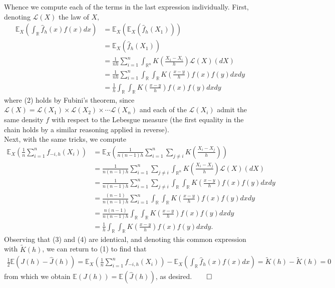 \documentclass[10pt]{article}
\newcommand{\E}{\mathbb{E}}
\newcommand{\bp}[1]{\left({#1}\right)}
\newcommand{\mbb}[1]{\mathbb{#1}}
\newcommand{\1}[1]{\mathbbm{1}_{#1}}
\newcommand{\mc}[1]{\mathcal{#1}}
\begin{document}
    Whence we compute each of the terms in the last expression individually. First, denoting $\mc{L}(X)$ the law of $X$, 
    \begin{align*}
        \E_X\bp{\int_\mbb{R}\hat{f}_h(x)f(x)dx}&=\E_X\bp{\E_X\bp{\hat{f}_h(X_1)}}\tag{since $X_1,\dots,X_n$ are i.i.d.}\\
        &=\E_X\bp{\hat{f}_h(X_1)}\\
        &=\frac{1}{nh}\sum_{i=1}^n\int_{\mbb{R}^n}K\bp{\frac{X_1-X_i}{h}}\mc{L}(X)(dX)\\
        &=\frac{1}{nh}\sum_{i=1}^n\int_\mbb{R}\int_{\mbb{R}}K\bp{\frac{x-y}{h}}f(x)f(y)dxdy\tag{2}\\
        &=\frac{1}{h}\int_\mbb{R}\int_\mbb{R}K\bp{\frac{x-y}{h}}f(x)f(y)dxdy\tag{3}
    \end{align*}
    where (2) holds by Fubini's theorem, since $\mc{L}(X)=\mc{L}(X_1)\times\mc{L}(X_2)\times\cdots\mc{L}(X_n)$ and each of the $\mc{L}(X_i)$ admit the same density $f$ with respect to the Lebesgue measure (the first equality in the chain holds by a similar reasoning applied in reverse).\\[5pt]
    Next, with the same tricks, we compute
    \begin{align*}
        \E_X\bp{\frac{1}{n}\sum_{i=1}^nf_{-i,h}(X_i)}&=\E_X\bp{\frac{1}{n(n-1)h}\sum_{i=1}^n\sum_{j\neq i}K\bp{\frac{X_i-X_j}{h}}}\\
        &=\frac{1}{n(n-1)h}\sum_{i=1}^n\sum_{j\neq i}\int_{\mbb{R}^n}K\bp{\frac{X_i-X_j}{h}}\mc{L}(X)(dX)\\
        &=\frac{1}{n(n-1)h}\sum_{i=1}^n\sum_{j\neq i}\int_\mbb{R}\int_\mbb{R}K\bp{\frac{x-y}{h}}f(x)f(y)dxdy\\
        &=\frac{(n-1)}{n(n-1)h}\sum_{i=1}^n\int_\mbb{R}\int_\mbb{R}K\bp{\frac{x-y}{h}}f(x)f(y)dxdy\\
        &=\frac{n(n-1)}{n(n-1)h}\int_\mbb{R}\int_\mbb{R}K\bp{\frac{x-y}{h}}f(x)f(y)dxdy\\
        &=\frac{1}{h}\int_\mbb{R}\int_\mbb{R}K\bp{\frac{x-y}{h}}f(x)f(y)dxdy.\tag{4}
    \end{align*} 
    Observing that (3) and (4) are identical, and denoting this common expression with $\tilde{K}(h)$, we can return to (1) to find that
    \begin{align*}
        \frac{1}{2}\E\bp{J(h)-\hat{J}(h)}=\E_X\bp{\frac{1}{n}\sum_{i=1}^nf_{-i,h}(X_i)}-\E_X\bp{\int_\mbb{R}\hat{f}_h(x)f(x)dx}=\tilde{K}(h)-\tilde{K}(h)=0
    \end{align*}
    from which we obtain $\E(J(h))=\E(\hat{J}(h))$, as desired.\hfill{$\qed$}\\[5pt]
\end{document}
